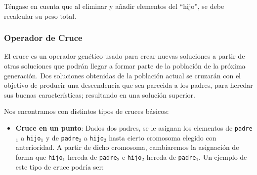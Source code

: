 Téngase en cuenta que al eliminar y añadir elementos del ``hijo'', se debe recalcular su peso total.

\subsubsection{Operador de Cruce}

El cruce es un operador genético usado para crear nuevas soluciones a partir de otras soluciones que podrán llegar a formar parte de la población de la próxima generación. 
Dos soluciones obtenidas de la población actual se cruzarán con el objetivo de producir una descendencia que sea parecida a los padres, para heredar sus buenas características; resultando en una solución superior. 

Nos encontramos con distintos tipos de cruces básicos:
\begin{itemize}
	\item \textbf{Cruce en un punto}:  Dados dos padres, se le asignan los elementos de \texttt{padre$_1$} a \texttt{hijo$_1$} y de \texttt{padre$_2$} a \texttt{hijo$_2$} hasta cierto cromosoma elegido con anterioridad. 
A partir de dicho cromosoma, cambiaremos la asignación de forma que \texttt{hijo$_1$} hereda de \texttt{padre$_2$} e \texttt{hijo$_2$} hereda de \texttt{padre$_1$}. 
Un ejemplo de este tipo de cruce podría ser:


\end{itemize}
